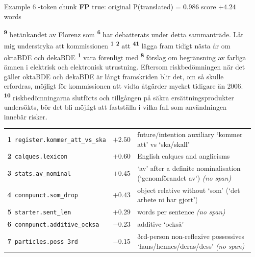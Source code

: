 \begin{exbox}[]{Example 6 -token chunk \quad \textbf{FP} \quad true: original \quad P(translated) = 0.986 \quad score $+4.24$  words}
{\setlength{\parindent}{0pt}\raggedright {}\textsuperscript{\sffamily\bfseries 9} betänkandet av Florenz som \textsuperscript{\sffamily\bfseries 6} har debatterats under detta sammanträde. Låt mig understryka att kommissionen \textsuperscript{\sffamily\bfseries 1} \textsuperscript{\sffamily\bfseries 2} att \textsuperscript{\sffamily\bfseries 4}\textsuperscript{\sffamily\bfseries 1} lägga fram tidigt nästa år om oktaBDE och dekaBDE \textsuperscript{\sffamily\bfseries 1} vara förenligt med \textsuperscript{\sffamily\bfseries 8} förslag om begränsning av farliga ämnen i elektrisk och elektronisk utrustning. Eftersom riskbedömningen när det gäller oktaBDE och dekaBDE är långt framskriden blir det, om så skulle erfordras, möjligt för kommissionen att vidta åtgärder mycket tidigare än 2006. \textsuperscript{\sffamily\bfseries 10} riskbedömningarna slutförts och tillgången på säkra ersättningsprodukter undersökts, bör det bli möjligt att fastställa i vilka fall som användningen innebär risker.}
\par\medskip
{\footnotesize
\begin{tabularx}{\linewidth}{@{}l r X@{}}
\textbf{1}~\texttt{register.kommer\_att\_vs\_ska} & $+2.50$ & future/intention auxiliary `kommer att' vs `ska/skall' \\
\textbf{2}~\texttt{calques.lexicon} & $+0.60$ & English calques and anglicisms \\
\textbf{3}~\texttt{stats.av\_nominal} & $+0.45$ & `av' after a definite nominalisation (`genomförandet av') \textit{(no span)} \\
\textbf{4}~\texttt{connpunct.som\_drop} & $+0.43$ & object relative without `som' (`det arbete ni har gjort') \\
\textbf{5}~\texttt{starter.sent\_len} & $+0.29$ & words per sentence \textit{(no span)} \\
\textbf{6}~\texttt{connpunct.additive\_ocksa} & $-0.23$ & additive `också' \\
\textbf{7}~\texttt{particles.poss\_3rd} & $-0.15$ & 3rd-person non-reflexive possessives `hans/hennes/deras/dess' \textit{(no span)} \\

\end{tabularx}}
\end{exbox}

